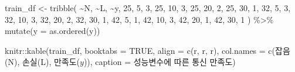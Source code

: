 \documentclass[
]{book}
\newenvironment{Shaded}{\begin{snugshade}}{\end{snugshade}}
\newcommand{\AttributeTok}[1]{\textcolor[rgb]{0.77,0.63,0.00}{#1}}
\newcommand{\ConstantTok}[1]{\textcolor[rgb]{0.00,0.00,0.00}{#1}}
\newcommand{\DecValTok}[1]{\textcolor[rgb]{0.00,0.00,0.81}{#1}}
\newcommand{\FunctionTok}[1]{\textcolor[rgb]{0.00,0.00,0.00}{#1}}
\newcommand{\NormalTok}[1]{#1}
\newcommand{\OtherTok}[1]{\textcolor[rgb]{0.56,0.35,0.01}{#1}}
\newcommand{\SpecialCharTok}[1]{\textcolor[rgb]{0.00,0.00,0.00}{#1}}
\newcommand{\StringTok}[1]{\textcolor[rgb]{0.31,0.60,0.02}{#1}}
\begin{document}
\begin{Shaded}
\begin{Highlighting}[]
\NormalTok{train\_df }\OtherTok{\textless{}{-}} \FunctionTok{tribble}\NormalTok{(}
  \SpecialCharTok{\textasciitilde{}}\NormalTok{N, }\SpecialCharTok{\textasciitilde{}}\NormalTok{L, }\SpecialCharTok{\textasciitilde{}}\NormalTok{y,}
  \DecValTok{25}\NormalTok{, }\DecValTok{5}\NormalTok{, }\DecValTok{3}\NormalTok{,}
  \DecValTok{25}\NormalTok{, }\DecValTok{10}\NormalTok{, }\DecValTok{3}\NormalTok{,}
  \DecValTok{25}\NormalTok{, }\DecValTok{20}\NormalTok{, }\DecValTok{2}\NormalTok{,}
  \DecValTok{25}\NormalTok{, }\DecValTok{30}\NormalTok{, }\DecValTok{1}\NormalTok{,}
  \DecValTok{32}\NormalTok{, }\DecValTok{5}\NormalTok{, }\DecValTok{3}\NormalTok{,}
  \DecValTok{32}\NormalTok{, }\DecValTok{10}\NormalTok{, }\DecValTok{3}\NormalTok{,}
  \DecValTok{32}\NormalTok{, }\DecValTok{20}\NormalTok{, }\DecValTok{2}\NormalTok{,}
  \DecValTok{32}\NormalTok{, }\DecValTok{30}\NormalTok{, }\DecValTok{1}\NormalTok{,}
  \DecValTok{42}\NormalTok{, }\DecValTok{5}\NormalTok{, }\DecValTok{1}\NormalTok{,}
  \DecValTok{42}\NormalTok{, }\DecValTok{10}\NormalTok{, }\DecValTok{3}\NormalTok{,}
  \DecValTok{42}\NormalTok{, }\DecValTok{20}\NormalTok{, }\DecValTok{1}\NormalTok{,}
  \DecValTok{42}\NormalTok{, }\DecValTok{30}\NormalTok{, }\DecValTok{1}
\NormalTok{) }\SpecialCharTok{\%\textgreater{}\%}
  \FunctionTok{mutate}\NormalTok{(}\AttributeTok{y =} \FunctionTok{as.ordered}\NormalTok{(y))}

\NormalTok{knitr}\SpecialCharTok{::}\FunctionTok{kable}\NormalTok{(train\_df, }\AttributeTok{booktabs =} \ConstantTok{TRUE}\NormalTok{,}
             \AttributeTok{align =} \FunctionTok{c}\NormalTok{(}\StringTok{\textquotesingle{}r\textquotesingle{}}\NormalTok{, }\StringTok{\textquotesingle{}r\textquotesingle{}}\NormalTok{, }\StringTok{\textquotesingle{}r\textquotesingle{}}\NormalTok{),}
             \AttributeTok{col.names =} \FunctionTok{c}\NormalTok{(}\StringTok{\textquotesingle{}잡음(N)\textquotesingle{}}\NormalTok{, }\StringTok{\textquotesingle{}손실(L)\textquotesingle{}}\NormalTok{, }\StringTok{\textquotesingle{}만족도($y$)\textquotesingle{}}\NormalTok{),}
             \AttributeTok{caption =} \StringTok{\textquotesingle{}성능변수에 따른 통신 만족도\textquotesingle{}}\NormalTok{)}
\end{Highlighting}
\end{Shaded}
\end{document}
